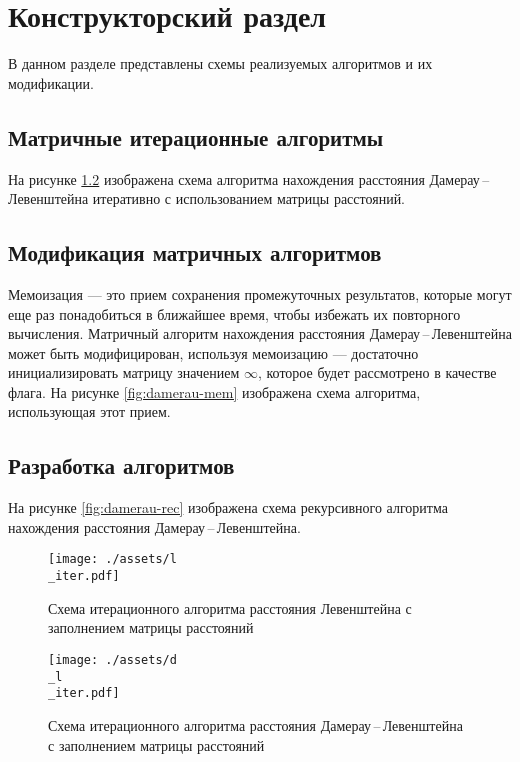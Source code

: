 \chapter{Конструкторский раздел}
В данном разделе представлены схемы реализуемых алгоритмов и их модификации.
\section{Матричные итерационные алгоритмы}
На рисунке \ref{fig:damerau-Page-1} изображена схема алгоритма нахождения расстояния Дамерау\,--\,Левенштейна итеративно  с использованием матрицы расстояний.
\section{Модификация матричных алгоритмов}
Мемоизация --- это прием сохранения промежуточных результатов, которые могут еще раз понадобиться в ближайшее время, чтобы избежать их повторного вычисления. 
Матричный алгоритм нахождения расстояния Дамерау\,--\,Левенштейна может быть модифицирован, используя мемоизацию --- достаточно инициализировать матрицу значением $\infty$, которое будет рассмотрено в качестве флага.
На рисунке \ref{fig:damerau-mem} изображена схема алгоритма, использующая этот прием.
\section{Разработка алгоритмов}
На рисунке \ref{fig:damerau-rec} изображена схема рекурсивного алгоритма  нахождения расстояния Дамерау\,--\,Левенштейна.
\newpage 

\begin{figure}[ht!]
	\begin{center}
		\texttt{[image: ./assets/l\\\_iter.pdf]}
	\end{center}
	
	\caption{Схема итерационного алгоритма расстояния Левенштейна с заполнением матрицы расстояний}
	\label{fig:lev-Page-1}
\end{figure}

\begin{figure}[ht!]
	\begin{center}
		\texttt{[image: ./assets/d\\\_l\\\_iter.pdf]}
	\end{center}
	
	\caption{Схема итерационного алгоритма расстояния Дамерау\,--\,Левенштейна с заполнением матрицы расстояний}
	\label{fig:damerau-Page-1}
\end{figure}

